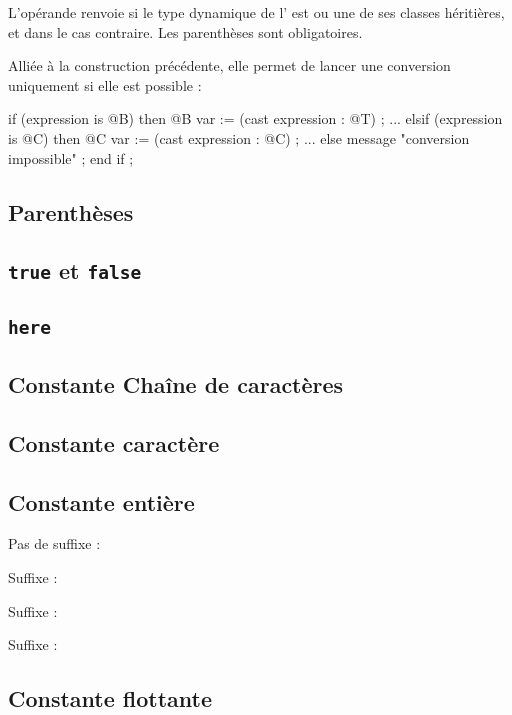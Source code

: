 L'opérande  renvoie  si le type dynamique de l' est  ou une de ses classes héritières, et  dans le cas contraire. Les parenthèses sont obligatoires.

Alliée à la construction précédente, elle permet de lancer une conversion uniquement si elle est possible :

\begin{galgascode}
if (expression is @B) then
  @B var := (cast expression : @T) ;
  ...
elsif (expression is @C) then
  @C var := (cast expression : @C) ;
  ...
else
  message "conversion impossible" ;
end if ;
\end{galgascode}

\subsection{Parenthèses}


\subsection{\texttt{true} et \texttt{false}}

\subsection{\texttt{here}}

\subsection{Constante Chaîne de caractères}

\subsection{Constante caractère}

\subsection{Constante entière}

Pas de suffixe : 

Suffixe  : 

Suffixe  : 

Suffixe  : 

\subsection{Constante flottante}

